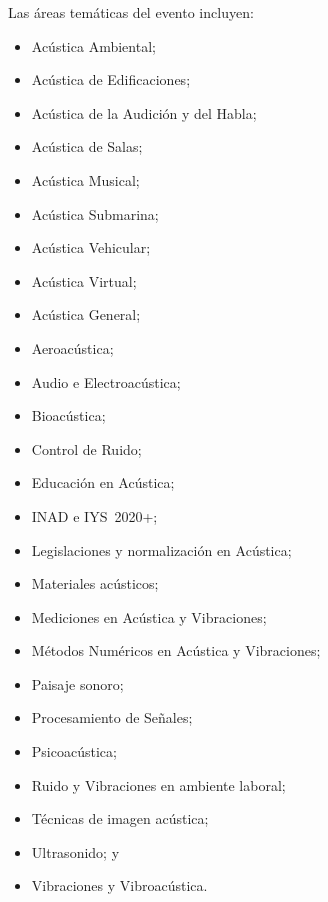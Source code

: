\documentclass[12pt, a4paper, twoside, twocolumn]{article}
\begin{document}
Las áreas temáticas del evento incluyen:
%	
\begin{itemize}[noitemsep,topsep=-1ex] \itemsep=1.0pt
\item[\textbullet] Acústica Ambiental;
\item[\textbullet] Acústica de Edificaciones;
\item[\textbullet] Acústica de la Audición y del Habla;
\item[\textbullet] Acústica de Salas;
\item[\textbullet] Acústica Musical;
\item[\textbullet] Acústica Submarina;
\item[\textbullet] Acústica Vehicular;
\item[\textbullet] Acústica Virtual;
\item[\textbullet] Acústica General;
\item[\textbullet] Aeroacústica;
\item[\textbullet] Audio e Electroacústica;
\item[\textbullet] Bioacústica;
\item[\textbullet] Control de Ruido;
\item[\textbullet] Educación en Acústica;
\item[\textbullet] INAD e IYS~2020+;
\item[\textbullet] Legislaciones y normalización en Acústica;
\item[\textbullet] Materiales acústicos;
\item[\textbullet] Mediciones en Acústica y Vibraciones;
\item[\textbullet] Métodos Numéricos en Acústica y Vibraciones;
\item[\textbullet] Paisaje sonoro;
\item[\textbullet] Procesamiento de Señales;
\item[\textbullet] Psicoacústica;
\item[\textbullet] Ruido y Vibraciones en ambiente laboral;
\item[\textbullet] Técnicas de imagen acústica;
\item[\textbullet] Ultrasonido; y
\item[\textbullet] Vibraciones y Vibroacústica.
\end{itemize}
	

\end{document}
